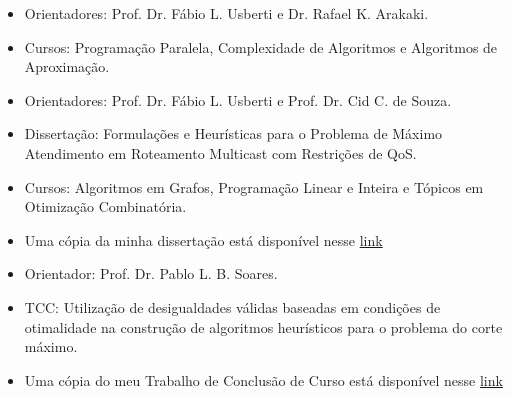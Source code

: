 \documentclass[10pt,a4paper,ragged2e,withhyper]{altacv}
\begin{document}
    \begin{paracol}{1}
            \medskip
            \medskip
		      \begin{itemize}
			      \item{Orientadores: Prof. Dr. Fábio L. Usberti e Dr. Rafael K. Arakaki.}
			      \item{Cursos: \textcolor{SecondaryColor}{Programação Paralela}, \textcolor{SecondaryColor}{Complexidade de Algoritmos} e \textcolor{SecondaryColor}{Algoritmos de Aproximação}.}
		      \end{itemize}
            \divider
            \medskip
		      \begin{itemize}
			      \item{Orientadores: Prof. Dr. Fábio L. Usberti e Prof. Dr. Cid C. de Souza.}
			      \item{Dissertação: Formulações e Heurísticas para o Problema de Máximo Atendimento em Roteamento Multicast com Restrições de QoS.}
			      \item{Cursos: \textcolor{SecondaryColor}{Algoritmos em Grafos}, \textcolor{SecondaryColor}{Programação Linear e Inteira} e \textcolor{SecondaryColor}{ Tópicos em Otimização Combinatória}.}
			      \item{Uma cópia da minha dissertação está disponível nesse
			      \href{https://hdl.handle.net/20.500.12733/1641777}{\textcolor{ThirdColor}{link}}}
		      \end{itemize}
            \divider
		      \begin{itemize}
		          \item{Orientador: Prof. Dr. Pablo L. B. Soares.}
			      \item{TCC: Utilização de desigualdades válidas baseadas em condições de otimalidade na construção de algoritmos heurísticos para o problema do corte máximo.}
  			      \item{Uma cópia do meu Trabalho de Conclusão de Curso está disponível nesse
			      \href{http://www.repositorio.ufc.br/handle/riufc/39085}{\textcolor{ThirdColor}{link}}}
		      \end{itemize}
		      

\end{paracol}
\end{document}
